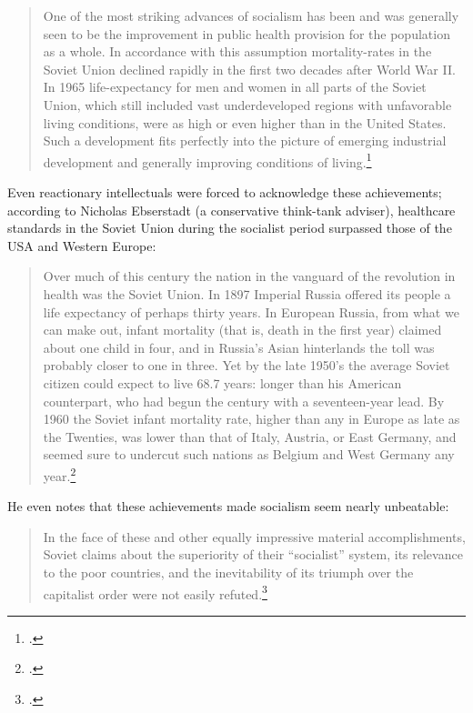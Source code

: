 \begin{quote}
One of the most striking advances of socialism has been and was
generally seen to be the improvement in public health provision for the
population as a whole. In accordance with this assumption
mortality-rates in the Soviet Union declined rapidly in the first two
decades after World War II. In 1965 life-expectancy for men and women in
all parts of the Soviet Union, which still included vast underdeveloped
regions with unfavorable living conditions, were as high or even higher
than in the United States. Such a development fits perfectly into the
picture of emerging industrial development and generally improving
  conditions of living.\footcite{dinkel1986declining}
\end{quote}

Even reactionary intellectuals were forced to acknowledge these
achievements; according to Nicholas Ebserstadt (a conservative
think-tank adviser), healthcare standards in the Soviet Union during the
socialist period surpassed those of the USA and Western Europe:

\begin{quote}
Over much of this century the nation in the vanguard of the revolution
in health was the Soviet Union. In 1897 Imperial Russia offered its
people a life expectancy of perhaps thirty years. In European Russia,
from what we can make out, infant mortality (that is, death in the first
year) claimed about one child in four, and in Russia's Asian hinterlands
the toll was probably closer to one in three. Yet by the late 1950's the
average Soviet citizen could expect to live 68.7 years: longer than his
American counterpart, who had begun the century with a seventeen-year
lead. By 1960 the Soviet infant mortality rate, higher than any in
Europe as late as the Twenties, was lower than that of Italy, Austria,
or East Germany, and seemed sure to undercut such nations as Belgium and
  West Germany any year.\footcite{dinkel1986declining}
\end{quote}

He even notes that these achievements made socialism seem nearly
unbeatable:

\begin{quote}
In the face of these and other equally impressive material
accomplishments, Soviet claims about the superiority of their
``socialist'' system, its relevance to the poor countries, and the
inevitability of its triumph over the capitalist order were not easily
  refuted.\footcite{dinkel1986declining}
\end{quote}

